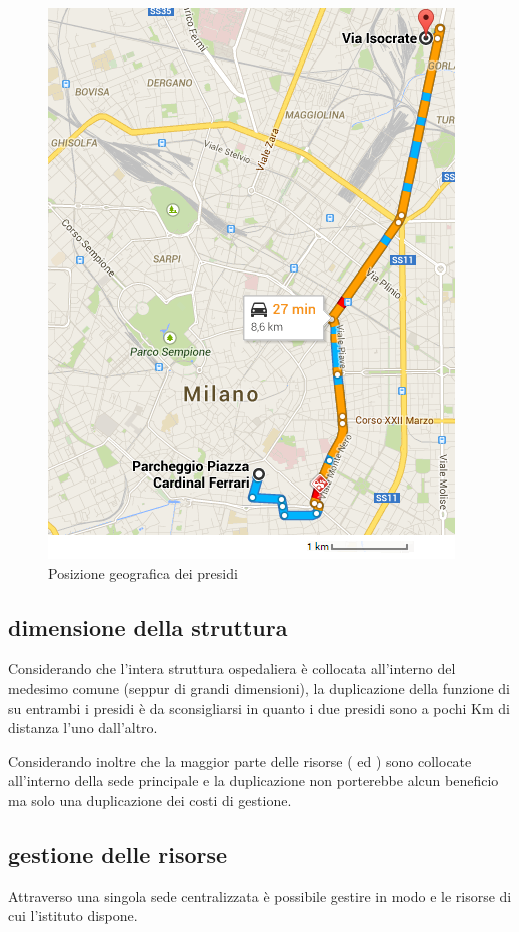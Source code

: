 \begin{figure}[htbp]
\centering
\includegraphics[scale=0.6]{Images/maps.png}
\caption{Posizione geografica dei presidi}
\label{sd-structure-maps}
\end{figure}

\subsection[Dimensione della struttura]{dimensione della struttura}
\label{sd-structure-size}
Considerando che l'intera struttura ospedaliera è collocata all'interno del medesimo comune (seppur di grandi dimensioni), la duplicazione della funzione di  su entrambi i presidi è da sconsigliarsi in quanto i due presidi sono a pochi Km di distanza l'uno dall'altro.

Considerando inoltre che la maggior parte delle risorse ( ed ) sono collocate all'interno della sede principale e la duplicazione non porterebbe alcun beneficio ma solo una duplicazione dei costi di gestione.

\subsection[Gestione delle risorse]{gestione delle risorse}
\label{sd-structure-resource-management}
Attraverso una singola sede centralizzata è possibile gestire in modo  e  le risorse di cui l'istituto dispone.

